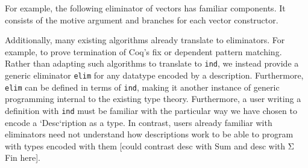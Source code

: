 \documentclass[preprint,authoryear]{sigplanconf}
\begin{document}
For example, the following eliminator of vectors has familiar
components. It consists of the motive argument and branches for each
vector constructor.

Additionally, many existing algorithms already translate to
eliminators. For example, to prove termination of Coq's fix or
dependent pattern matching. Rather than adapting such algorithms to
translate to {\tt ind}, we instead provide a generic eliminator {\tt elim} for
any datatype encoded by a description. Furthermore, {\tt elim} can be
defined in terms of {\tt ind}, making it another instance of generic
programming internal to the existing type theory.
Furthermore, a user writing a definition with {\tt ind} must be familiar
with the particular way we have chosen to encode a `Desc`ription as a
type. In contrast, users already familiar with eliminators need not
understand how descriptions work to be able to program with types
encoded with them [could contrast desc with Sum and desc with Σ Fin
here]. 



\end{document}
